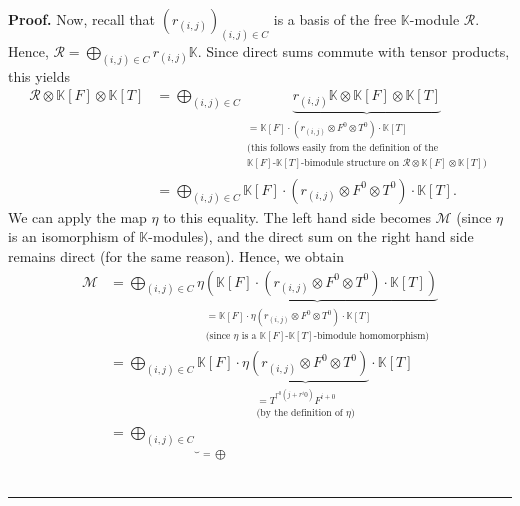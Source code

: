 \documentclass[numbers=enddot,12pt,final,onecolumn,notitlepage]{scrartcl}%
\theoremstyle{definition}
\newenvironment{proof}[1][Proof]{\noindent\textbf{#1.} }{\ \rule{0.5em}{0.5em}}
\begin{document}
\begin{proof}
Now, recall that $\left(  r_{\left(  i,j\right)  }\right)  _{\left(
i,j\right)  \in C}$ is a basis of the free $\mathbb{K}$-module $\mathcal{R}$.
Hence, $\mathcal{R}=\bigoplus_{\left(  i,j\right)  \in C}r_{\left(
i,j\right)  }\mathbb{K}$. Since direct sums commute with tensor products, this
yields%
\begin{align*}
\mathcal{R}\otimes\mathbb{K}\left[  F\right]  \otimes\mathbb{K}\left[
T\right]   &  =\bigoplus_{\left(  i,j\right)  \in C}\underbrace{r_{\left(
i,j\right)  }\mathbb{K}\otimes\mathbb{K}\left[  F\right]  \otimes
\mathbb{K}\left[  T\right]  }_{\substack{=\mathbb{K}\left[  F\right]
\cdot\left(  r_{\left(  i,j\right)  }\otimes F^{0}\otimes T^{0}\right)
\cdot\mathbb{K}\left[  T\right]  \\\text{(this follows easily from the
definition of the}\\\mathbb{K}\left[  F\right]  \text{-}\mathbb{K}\left[
T\right]  \text{-bimodule structure on }\mathcal{R}\otimes\mathbb{K}\left[
F\right]  \otimes\mathbb{K}\left[  T\right]  \text{)}}}\\
&  =\bigoplus_{\left(  i,j\right)  \in C}\mathbb{K}\left[  F\right]
\cdot\left(  r_{\left(  i,j\right)  }\otimes F^{0}\otimes T^{0}\right)
\cdot\mathbb{K}\left[  T\right]  .
\end{align*}
We can apply the map $\eta$ to this equality. The left hand side becomes
$\mathcal{M}$ (since $\eta$ is an isomorphism of $\mathbb{K}$-modules), and
the direct sum on the right hand side remains direct (for the same reason).
Hence, we obtain%
\begin{align*}
\mathcal{M}  &  =\bigoplus_{\left(  i,j\right)  \in C}\underbrace{\eta\left(
\mathbb{K}\left[  F\right]  \cdot\left(  r_{\left(  i,j\right)  }\otimes
F^{0}\otimes T^{0}\right)  \cdot\mathbb{K}\left[  T\right]  \right)
}_{\substack{=\mathbb{K}\left[  F\right]  \cdot\eta\left(  r_{\left(
i,j\right)  }\otimes F^{0}\otimes T^{0}\right)  \cdot\mathbb{K}\left[
T\right]  \\\text{(since }\eta\text{ is a }\mathbb{K}\left[  F\right]
\text{-}\mathbb{K}\left[  T\right]  \text{-bimodule homomorphism)}}}\\
&  =\bigoplus_{\left(  i,j\right)  \in C}\mathbb{K}\left[  F\right]
\cdot\underbrace{\eta\left(  r_{\left(  i,j\right)  }\otimes F^{0}\otimes
T^{0}\right)  }_{\substack{=T^{r^{0}\left(  j+r^{i}0\right)  }F^{i+0}%
\\\text{(by the definition of }\eta\text{)}}}\cdot\mathbb{K}\left[  T\right]
\\
&  =\underbrace{\bigoplus_{\left(  i,j\right)  \in C}}_{=\bigoplus
}
\end{align*}
\end{proof}
\end{document}

